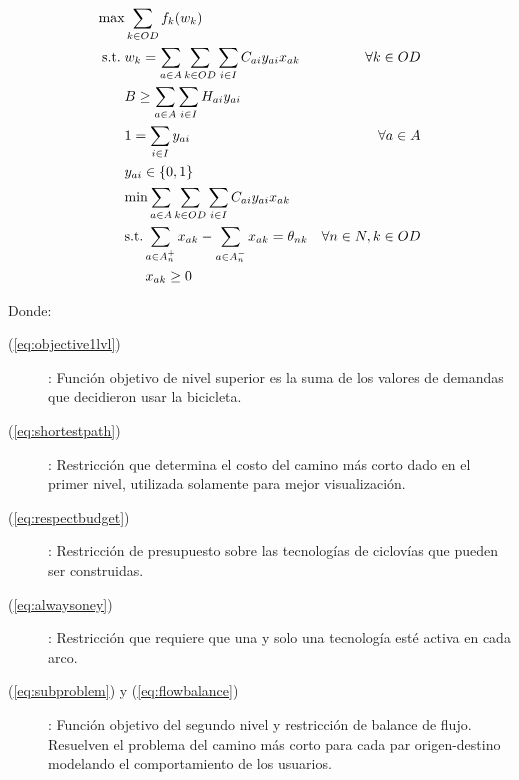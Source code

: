 \documentclass{article}
\newcommand{\modelspace}{\hspace{1.5em}}
\begin{document}
  \begin{align}
    \text{max}    & \sum_{k \in OD} f_k(w_k)                                                         & \label{eq:objective1lvl} \\
    \text{s.t.}\; & w_k = \sum_{a \in A} \sum_{k \in OD} \sum_{i \in I} C_{ai}y_{ai}x_{ak}           & \forall k \in OD \label{eq:shortestpath} \\
                  & B \geq \sum_{a \in A} \sum_{i \in I} H_{ai}y_{ai}                                & \label{eq:respectbudget} \\
                  & 1 = \sum_{i \in I} y_{ai}                                                        & \forall a \in A \label{eq:alwaysoney} \\
                  & y_{ai} \in \{0,1\}                                                   & \nonumber \\
                  & \text{min} \sum_{a \in A} \sum_{k \in OD} \sum_{i \in I} C_{ai}y_{ai}x_{ak}      & \label{eq:subproblem} \\
                  & \text{s.t.} \sum_{a \in A_n^+} x_{ak} - \sum_{a \in A_n^-} x_{ak} = \theta_{nk}  & \forall n \in N, k \in OD \label{eq:flowbalance} \\
                  & \modelspace x_{ak} \geq 0                                                        & \nonumber
  \end{align}

  Donde:

  \begin{description}
    \item[(\ref{eq:objective1lvl})]: Función objetivo de nivel superior es la suma de los valores de demandas que decidieron usar la bicicleta.
    \item[(\ref{eq:shortestpath})]: Restricción que determina el costo del camino más corto dado en el primer nivel, utilizada solamente para mejor visualización.
    \item[(\ref{eq:respectbudget})]: Restricción de presupuesto sobre las tecnologías de ciclovías que pueden ser construidas.
    \item[(\ref{eq:alwaysoney})]: Restricción que requiere que una y solo una tecnología esté activa en cada arco.
    \item[(\ref{eq:subproblem}) y (\ref{eq:flowbalance})]: Función objetivo del segundo nivel y restricción de balance de flujo. Resuelven el problema del camino más corto para cada par origen-destino modelando el comportamiento de los usuarios.
  \end{description}
\end{document}

